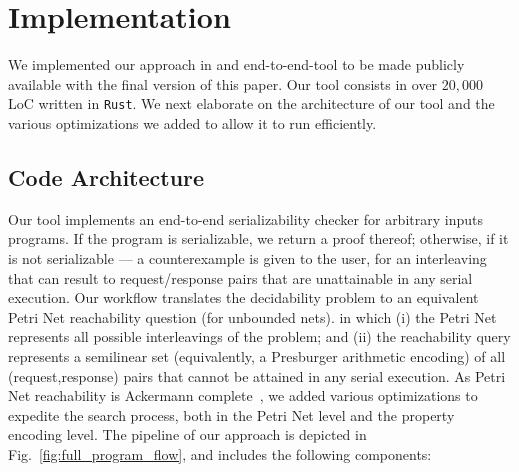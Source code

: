 

\section{Implementation}
\label{sec:implementation}

We implemented our approach in and end-to-end-tool to be made publicly available with the final version of this paper. Our tool consists in over $20{,}000$ LoC written in \texttt{Rust}.
%
We next elaborate on the architecture of our tool and the various optimizations we added to allow it to run efficiently.





\subsection{Code Architecture}

\label{subsec:codeArchitecture}

Our tool implements an end-to-end serializability checker for arbitrary inputs programs. If the program is serializable, we return a proof thereof; otherwise, if it is not serializable --- a counterexample is given to the user, for an interleaving that can result to request/response pairs that are unattainable in any serial execution.
%
Our workflow translates the decidability problem to an equivalent Petri Net reachability question (for unbounded nets). in which (i) the Petri Net represents all possible interleavings of the problem; and (ii) the reachability query represents a semilinear set (equivalently, a Presburger arithmetic encoding) of all (request,response) pairs that cannot be attained in any serial execution.
%
As Petri Net reachability is Ackermann complete~\cite{CzWo22}, we added various optimizations to expedite the search process, both in the Petri Net level and the property encoding level.
%
The pipeline of our approach is depicted in Fig.~\ref{fig:full_program_flow}, and includes the following components:
 

